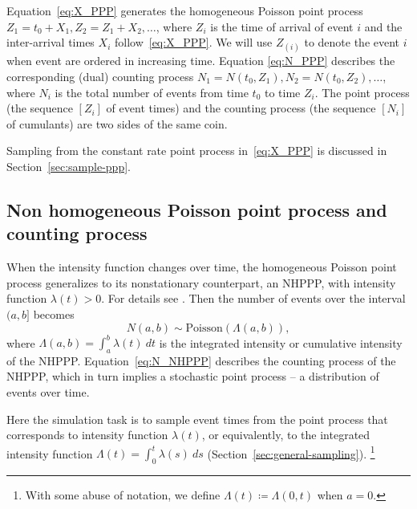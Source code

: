 \documentclass[article,nojss]{jss}\usepackage[]{graphicx}\usepackage[]{xcolor}
\begin{document}
Equation~\eqref{eq:X_PPP} generates the homogeneous Poisson point process ${Z_1 = t_0 + X_1, Z_2 = Z_1 + X_2, \dots}$, where $Z_i$ is the time of arrival of event $i$ and the inter-arrival times $X_i$ follow~\eqref{eq:X_PPP}. We will use $Z_{(i)}$ to denote the event $i$ when event are ordered in increasing time.
%
Equation \eqref{eq:N_PPP} describes the corresponding (dual) counting process
${N_1 = N(t_0, Z_1)}, {N_2 = N(t_0, Z_2), \dots}$, where $N_i$ is the total number of events from time $t_0$ to time $Z_i$. The point process (the sequence $[Z_i]$ of event times) and the counting process (the sequence $[N_i]$ of cumulants) are two sides of the same coin.

Sampling from the constant rate point process in~\eqref{eq:X_PPP} is discussed in Section~\ref{sec:sample-ppp}.


\subsection{Non homogeneous Poisson point process and counting process}\label{sec:nhppp-intro}
When the intensity function changes over time, the homogeneous Poisson point process generalizes to its nonstationary counterpart, an NHPPP, with intensity function $\lambda(t) > 0$. For details see \citet[par 4.2]{cox1965theory}. Then the number of events over the interval $(a, b]$ becomes
\begin{equation}\label{eq:N_NHPPP}
N(a, b) \sim \text{Poisson}(\Lambda(a, b)),
\end{equation}
where $\Lambda(a, b) = \int_a^b \lambda(t) \ dt$ is the integrated intensity or cumulative intensity of the NHPPP. Equation~\eqref{eq:N_NHPPP} describes the counting process of the NHPPP, which in turn implies a stochastic point process -- a distribution of events over time.

Here the simulation task is to sample event times from the point process that corresponds to intensity function $\lambda(t)$, or equivalently, to the integrated intensity function $\Lambda(t) = \int_0^t \lambda(s) \ ds$ (Section~\ref{sec:general-sampling}).%
\footnote{With some abuse of notation, we define $\Lambda(t) \coloneqq \Lambda(0, t)$ when  $a=0$.}
\end{document}
